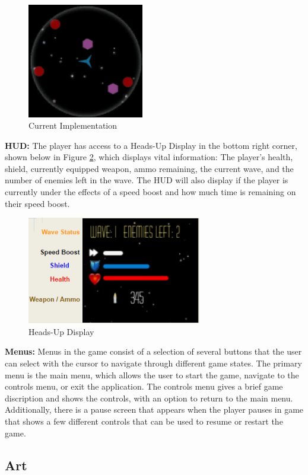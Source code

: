 \documentclass[12pt]{article}       %
\begin{document}
\begin{figure} [H]
\centering
\includegraphics[width=2in]{radarExample2.png}
\caption{Current Implementation} \label{RadarTwo}
\end{figure}

	{\bf HUD:} The player has access to a Heads-Up Display in the bottom right corner, shown below in Figure \ref{HUDDia}, which displays vital information: The player's health, shield, currently equipped weapon, ammo remaining, the current wave, and the number of enemies left in the wave. The HUD will also display if the player is currently under the effects of a speed boost and how much time is remaining on their speed boost.

\begin{figure} [H] \centering\includegraphics[width=3in] {HUDDiagram.png}\caption{Heads-Up Display} \label{HUDDia}\end{figure}

	{\bf Menus:} Menus in the game consist of a selection of several buttons that the user can select with the cursor to navigate through different game states. The primary menu is the main menu, which allows the user to start the game, navigate to the controls menu, or exit the application. The controls menu gives a brief game discription and shows the controls, with an option to return to the main menu. Additionally, there is a pause screen that appears when the player pauses in game that shows a few different controls that can be used to resume or restart the game.

\subsection{Art} %
\end{document}
